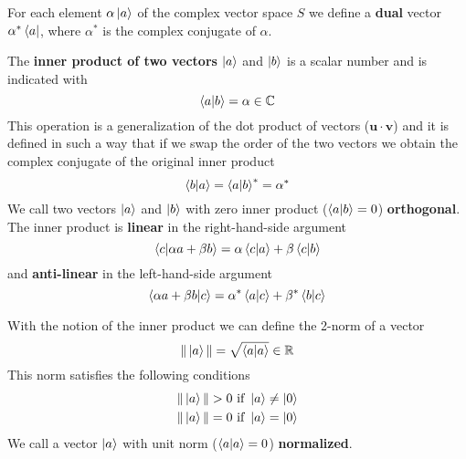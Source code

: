 \documentclass[../Main/chem532-notes.tex]{subfiles}
\begin{document}
For each element $\alpha \ket{a}$ of the complex vector space $S$ we define a \textbf{dual} vector $\alpha^* \bra{a}$, where $\alpha^*$ is the complex conjugate of $\alpha$.

The \textbf{inner product of two vectors} $\ket{a}$ and $\ket{b}$ is a scalar number and is indicated with
\begin{equation}
\braket{a|b} = \alpha \in \mathbb{C}
\end{equation}
This operation is a generalization of the dot product of vectors ($\mathbf{u} \cdot \mathbf{v}$) and it is defined in such a way that if we swap the order of the two vectors we obtain the complex conjugate of the original inner product
\begin{equation}
\label{eq:bg:braket_conjugate}
\braket{b|a}  = \braket{a|b}^* = \alpha^*
\end{equation}
We call two vectors $\ket{a}$ and $\ket{b}$ with zero inner product ($ \braket{a|b} = 0$) \textbf{orthogonal}.
The inner product is \textbf{linear} in the right-hand-side argument
\begin{equation}
\braket{c|\alpha a + \beta b}  = \alpha \braket{c|a} + \beta \braket{c|b} 
\end{equation}
and \textbf{anti-linear} in the left-hand-side argument
\begin{equation}
\braket{\alpha a + \beta b | c}  = \alpha^* \braket{a|c} + \beta^* \braket{b|c} 
\end{equation}


With the notion of the inner product we can define the 2-norm of a vector
\begin{equation}
\| \ket{a} \| = \sqrt{ \braket{a|a} } \in \mathbb{R} 
\end{equation}
This norm satisfies the following conditions
\begin{equation}
\begin{split}
\| \ket{a} \| > 0 \text{ if } \ket{a} \neq \ket{0} \\
\| \ket{a} \| = 0 \text{ if } \ket{a} = \ket{0}
\end{split}
\end{equation}
We call a vector $\ket{a}$ with unit norm ($\braket{a|a} = 0$) \textbf{normalized}.
\end{document}
